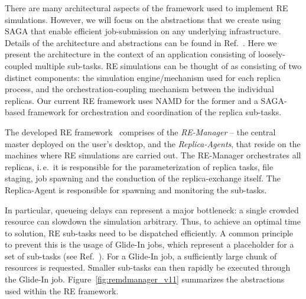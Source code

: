 \documentclass{llncs}
\begin{document}
There are many architectural aspects of the framework used to
implement RE simulations. However, we will focus on the abstractions
that we create using SAGA that enable efficient job-submission on any
underlying infrastructure.  Details of the architecture and
abstractions can be found in
Ref.~\cite{repex_ptrsa,repex_escience08}. Here we present the
architecture in the context of an application consisting of
loosely-coupled multiple sub-tasks. RE simulations can be thought of
as consisting of two distinct components: the simulation
engine/mechanism used for each replica process, and the
orchestration-coupling mechanism between the individual replicas. Our
current RE framework uses NAMD for the former and a SAGA-based
framework for orchestration and coordination of the replica sub-tasks.

The developed RE framework~\cite{repex_escience08} comprises of the
\emph{RE-Manager} -- the central master deployed on the user's
desktop, and the \textit{Replica-Agents}, that reside on the machines
where RE simulations are carried out. The RE-Manager orchestrates all
replicas, i.\,e.\ it is responsible for the parameterization of
replica tasks, file staging, job spawning and the conduction of the
replica-exchange itself.  The Replica-Agent is responsible for
spawning and monitoring the sub-tasks.

In particular, queueing delays can represent a major bottleneck: a
single crowded resource can slowdown the simulation arbitrary. Thus,
to achieve an optimal time to solution, RE sub-tasks need to be
dispatched efficiently.  A common principle to prevent this is the
usage of Glide-In jobs, which represent a placeholder for a set of
sub-tasks (see Ref.~\cite{citeulike:291860}).  For a Glide-In
job, a sufficiently large chunk of resources is requested. Smaller
sub-tasks can then rapidly be executed through the Glide-In job.
Figure~\ref{fig:remdmanager_v11} summarizes the abstractions used
within the RE framework.
\end{document}
